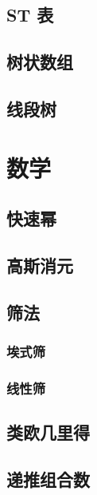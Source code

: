 \documentclass{article}
\begin{document}
\subsection{ST 表}

\subsection{树状数组}

\subsection{线段树}

\section{数学}

\subsection{快速幂}



\subsection{高斯消元}



\subsection{筛法}

\subsubsection{埃式筛}

\subsubsection{线性筛}

\subsection{类欧几里得}

\subsection{递推组合数}
\end{document}
